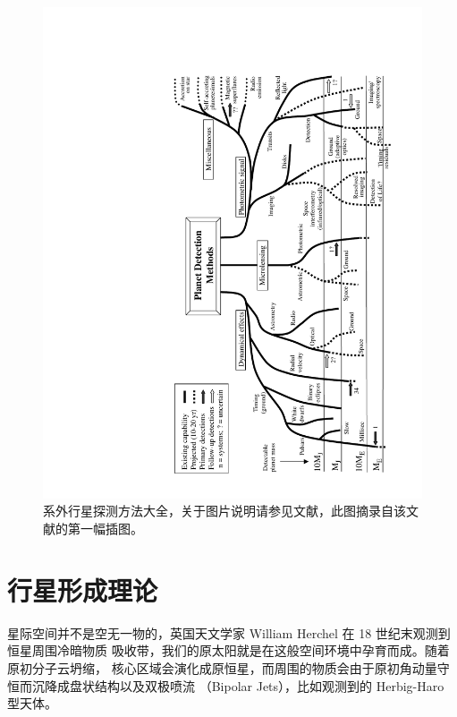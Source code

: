 \begin{figure}
    \centering
    \includegraphics[scale=0.95, angle=-90]{figures/chapter1/fig4_fmethods.pdf}
    \caption[系外行星探测方法大全，图片版权 Michael Perryman。]{系外行星探测方法大全，关于图片说明请参见文献，此图摘录自该文献的第一幅插图。}
    \label{fig:detmethod}
\end{figure}


\section{行星形成理论} \label{sec:pltfrmatntheory}


星际空间并不是空无一物的，英国天文学家 William Herchel 在 18 世纪末观测到恒星周围冷暗物质
吸收带，我们的原太阳就是在这般空间环境中孕育而成\cite{Spitzer1978}。随着原初分子云坍缩，
核心区域会演化成原恒星，而周围的物质会由于原初角动量守恒而沉降成盘状结构以及双极喷流
（Bipolar Jets），比如观测到的 Herbig-Haro 型天体\cite{Lequeux2005}。

